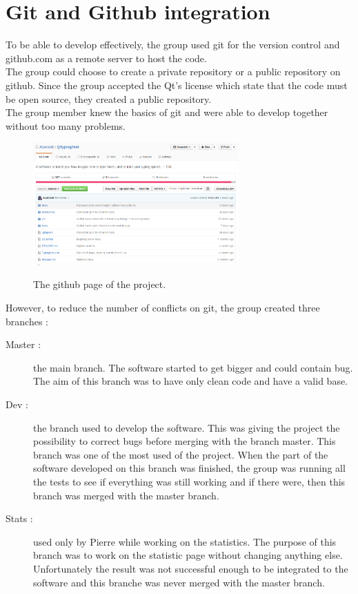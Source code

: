\chapter{Git and Github integration}
To be able to develop effectively, the group used git for the version control and github.com as a remote server to host the code.\\
The group could choose to create a private repository or a public repository on github. Since the group accepted the Qt's license which state that the code must be open source, they created a public repository.\\
The group member knew the basics of git and were able to develop together without too many problems.\\

\begin{figure}[H]
	\centering
	\includegraphics[width=0.7\textwidth]{images/github-main.png}
	\label{github-main}
	\caption{The github page of the project.}
\end{figure}


However, to reduce the number of conflicts on git, the group created three branches :
\begin{description}
	\item[Master  :] the main branch. The software started to get bigger and could contain bug. The aim of this branch was to have only clean code and have a valid base.
	\item[Dev : ] the branch used to develop the software. This was giving the project the possibility to correct bugs before merging with the branch master. This branch was one of the most used of the project. When the part of the software developed on this branch was finished, the group was running all the tests to see if everything was still working and if there were, then this branch was merged with the master branch.
	\item[Stats : ] used only by Pierre while working on the statistics. The purpose of this branch was to work on the statistic page without changing anything else. Unfortunately the result was not successful enough to be integrated to the software and this branche was never merged with the master branch.
\end{description}

